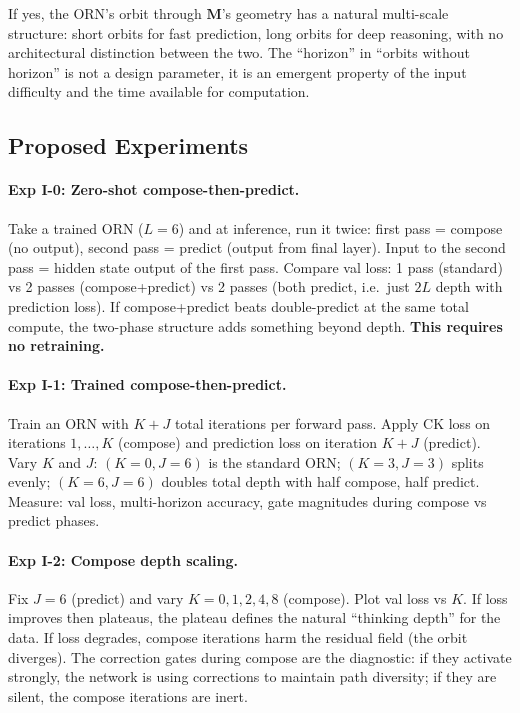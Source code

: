 \documentclass[11pt, a4paper]{article}
\newcommand{\M}{\mathbf{M}}
\theoremstyle{plain}
\theoremstyle{definition}
\theoremstyle{remark}
\begin{document}
If yes, the ORN's orbit through $\M$'s geometry has a natural multi-scale structure: short orbits for fast prediction, long orbits for deep reasoning, with no architectural distinction between the two.
The ``horizon'' in ``orbits without horizon'' is not a design parameter, it is an emergent property of the input difficulty and the time available for computation.

\subsection{Proposed Experiments}\label{sec:compose-experiments}

\paragraph{Exp I-0: Zero-shot compose-then-predict.}
Take a trained ORN ($L{=}6$) and at inference, run it twice: first pass = compose (no output), second pass = predict (output from final layer).
Input to the second pass = hidden state output of the first pass.
Compare val loss: 1 pass (standard) vs 2 passes (compose+predict) vs 2 passes (both predict, i.e.\ just $2L$ depth with prediction loss).
If compose+predict beats double-predict at the same total compute, the two-phase structure adds something beyond depth.
\textbf{This requires no retraining.}

\paragraph{Exp I-1: Trained compose-then-predict.}
Train an ORN with $K{+}J$ total iterations per forward pass.
Apply CK loss on iterations $1, \ldots, K$ (compose) and prediction loss on iteration $K{+}J$ (predict).
Vary $K$ and $J$: $(K{=}0, J{=}6)$ is the standard ORN; $(K{=}3, J{=}3)$ splits evenly; $(K{=}6, J{=}6)$ doubles total depth with half compose, half predict.
Measure: val loss, multi-horizon accuracy, gate magnitudes during compose vs predict phases.

\paragraph{Exp I-2: Compose depth scaling.}
Fix $J{=}6$ (predict) and vary $K = 0, 1, 2, 4, 8$ (compose).
Plot val loss vs $K$.
If loss improves then plateaus, the plateau defines the natural ``thinking depth'' for the data.
If loss degrades, compose iterations harm the residual field (the orbit diverges).
The correction gates during compose are the diagnostic: if they activate strongly, the network is using corrections to maintain path diversity; if they are silent, the compose iterations are inert.
\end{document}
